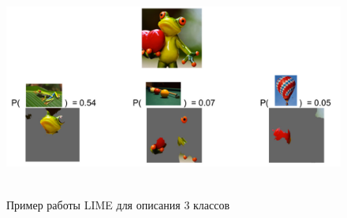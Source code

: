\documentclass[12pt,a4paper]{article}
\begin{document}
%
%
%

\begin{center}
\begin{figure}[!htb]
 \centering
 \includegraphics[width=0.9\linewidth]{lime_result.jpg}
 \caption{Пример работы LIME для описания 3 классов}
\end{figure}
\end{center}

%
\end{document}
